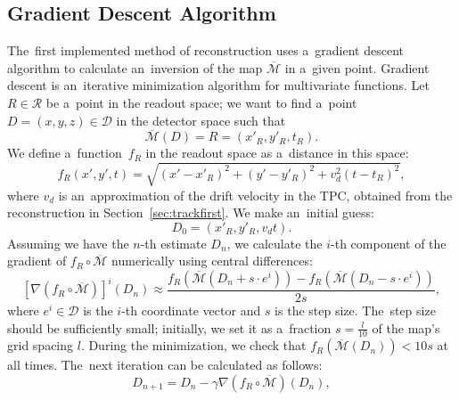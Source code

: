 		\subsection{Gradient Descent Algorithm}
		\label{sec:grad}			
			The~first implemented method of reconstruction uses a~gradient descent algorithm to calculate an~inversion of the map $\overline{\mathcal{M}}$ in a~given point. Gradient descent is an~iterative minimization algorithm for multivariate functions. Let $R\in\mathcal{R}$ be a~point in the readout space; we want to find a~point $D = (x,y,z) \in\mathcal{D}$ in the detector space such that 
				\begin{equation}
					\overline{\mathcal{M}}(D) = R = (x'_R,y'_R,t_R).
				\end{equation}
			We define a~function~$f_R$ in the readout space as a~distance in this space:
				\begin{equation}
					f_R(x',y',t) = \sqrt{(x'-x'_R)^2+(y'-y'_R)^2+v_d^2(t-t_R)^2},
				\end{equation}
			where $v_d$ is an~approximation of the drift velocity in the \ac{TPC}, obtained from the reconstruction in Section~\ref{sec:trackfirst}. We make an~initial guess:
				\begin{equation}
					D_0 = (x'_R,y'_R,v_dt).
				\end{equation}
			Assuming we have the $n$-th estimate $D_n$, we calculate the $i$-th component of the gradient of $f_R\circ\overline{\mathcal{M}}$ numerically using central differences:
				\begin{equation}
					\left[\nabla(f_R\circ\overline{\mathcal{M}})\right]^i(D_n) \approx \frac{f_R(\overline{\mathcal{M}}(D_n+s\cdot e^i))-f_R(\overline{\mathcal{M}}(D_n-s\cdot e^i))}{2s},
				\end{equation}
			where $e^i\in\mathcal{D}$ is the $i$-th coordinate vector and $s$ is the step size. The~step size should be sufficiently small; initially, we set it as a~fraction $s = \frac{l}{10}$ of the map's grid spacing $l$. During the minimization, we check that $f_R(\overline{\mathcal{M}}(D_n))<10s$ at all times. The~next iteration can be calculated as follows:
				\begin{equation}
					D_{n+1} = D_n - \gamma \nabla(f_R\circ\overline{\mathcal{M}})(D_n),
				\end{equation}

